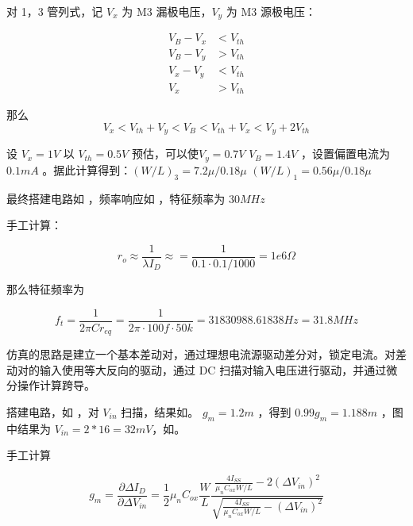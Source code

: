 \documentclass[lang=cn,11pt,a4paper,cite=authoryear]{elegantpaper}
\begin{document}

对 1，3 管列式，记 \(V_x\) 为 M3 漏极电压，\(V_y\) 为 M3 源极电压：

\[\begin{aligned}
    V_B - V_x &< V_{th} \\
    V_B - V_y &> V_{th} \\ 
    V_x - V_y &< V_{th} \\ 
    V_x &> V_{th}
\end{aligned}\]

那么 \[V_x < V_{th} + V_y < V_B < V_{th} + V_x < V_y + 2 V_{th}\]



设 \(V_x = 1 V\) 以 \(V_{th} = 0.5 V\) 预估，可以使\(V_y  =0.7 V\) \(V_B = 1.4 V\) ，设置偏置电流为 \(0.1 mA\) 。据此计算得到：\((W/L)_3 = 7.2\mu / 0.18 \mu\) \((W/L)_1 = 0.56 
\mu/0.18\mu \)

最终搭建电路如  ，频率响应如 ，特征频率为 \(30 M Hz\)





手工计算：

\[r_o \approx \frac{1}{\lambda I_D} \approx = \frac{1}{0.1 \cdot 0.1 / 1000} = 1e6 \Omega\]

那么特征频率为

\[f_t = \frac{1}{2 \pi C r_{eq}} = \frac{1}{2 \pi \cdot 100 f \cdot 50 k} = 31830988.61838 Hz = 31.8 MHz\] 


仿真的思路是建立一个基本差动对，通过理想电流源驱动差分对，锁定电流。对差动对的输入使用等大反向的驱动，通过 DC 扫描对输入电压进行驱动，并通过微分操作计算跨导。


搭建电路，如 ，对 \(V_{in}\) 扫描，结果如。 \(g_m = 1.2 m\) ，得到 \(0.99 g_m = 1.188 m\) ，图中结果为 \(V_{in} = 2 *16 = 32 mV\)，如。


手工计算 

\[g_m=\frac{\partial \Delta I_{D}}{\partial \Delta V_{i n}}=\frac{1}{2} \mu_{n} C_{o x} \frac{W}{L} \frac{\frac{4 I_{S S}}{\mu_{n} C_{o x} W / L}-2\left(\Delta V_{i n}\right)^{2}}{\sqrt{\frac{4 I_{S S}}{\mu_{n} C_{o x} W / L}-\left(\Delta V_{i n}\right)^{2}}}\]
\end{document}
